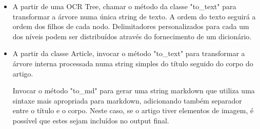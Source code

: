 \begin{itemize}\setlength\itemsep{-0.3em}
	\item A partir de uma OCR Tree, chamar o método da classe "to\_text" para transformar a árvore numa única string de texto. A ordem do texto seguirá a ordem dos filhos de cada nodo. Delimitadores personalizados para cada um dos níveis podem ser distribuídos através do fornecimento de um dicionário.
	\item A partir da classe Article, invocar o método "to\_text" para transformar a árvore interna processada numa string simples do título seguido do corpo do artigo. 
	
	Invocar o método "to\_md" para gerar uma string markdown que utiliza uma sintaxe mais apropriada para markdown, adicionando também separador entre o título e o corpo. Neste caso, se o artigo tiver elementos de imagem, é possível que estes sejam incluídos no output final.
\end{itemize}






